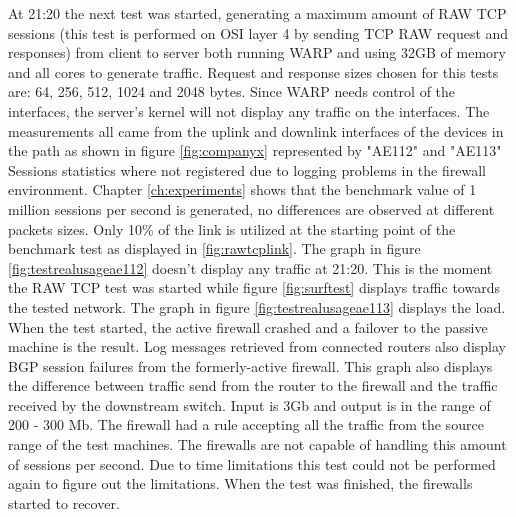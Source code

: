 At 21:20 the next test was started, generating a maximum amount of RAW TCP sessions (this test is performed on OSI layer 4 by sending TCP RAW request and responses) from client to server both running WARP and using 32GB of memory and all cores to generate traffic.
Request and response sizes chosen for this tests are: 64, 256, 512, 1024 and 2048 bytes. 
Since WARP needs control of the interfaces, the server's kernel will not display any traffic on the interfaces. 
The measurements all came from the uplink and downlink interfaces of the devices in the path as shown in figure \ref{fig:companyx} represented by "AE112" and "AE113"
Sessions statistics where not registered due to logging problems in the firewall environment. 
Chapter \ref{ch:experiments} shows that the benchmark value of 1 million sessions per second is generated, no differences are observed at different packets sizes. 
Only 10\% of the link is utilized at the starting point of the benchmark test as displayed in \ref{fig:rawtcplink}. 
The graph in figure \ref{fig:testrealusageae112} doesn't display any traffic at 21:20. This is the moment the RAW TCP test was started while figure \ref{fig:surftest} displays traffic towards the tested network. 
The graph in figure \ref{fig:testrealusageae113} displays the load. When the test started, the active firewall crashed and a failover to the passive machine is the result. Log messages retrieved from connected routers also display BGP session failures from the formerly-active firewall. 
This graph also displays the difference between traffic send from the router to the firewall and the traffic received by the downstream switch. 
Input is 3Gb and output is in the range of 200 - 300 Mb. The firewall had a rule accepting all the traffic from the source range of the test machines.
The firewalls are not capable of handling this amount of sessions per second. Due to time limitations this test could not be performed again to figure out the limitations.  
When the test was finished, the firewalls started to recover. \\ 

